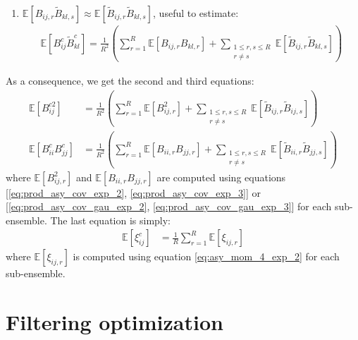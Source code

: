 \documentclass[12pt]{scrartcl}
\begin{document}
\begin{enumerate}
\begin{enumerate}
\item $\mathbb{E} \left[B_{ij,r} \widetilde{B}_{kl,s}\right] \approx \mathbb{E} \left[\widetilde{B}_{ij,r} \widetilde{B}_{kl,s}\right]$, useful to estimate:
\begin{align}
\mathbb{E} \left[B^c_{ij} \widetilde{B}^c_{kl} \right] = \frac{1}{R^2} \left(\sum_{r=1}^R \mathbb{E} \left[B_{ij,r} B_{kl,r}\right] + \sum_{\substack{1 \le r,s \le R\\r \ne s}} \mathbb{E} \left[\widetilde{B}_{ij,r} \widetilde{B}_{kl,s}\right]\right)
\end{align}
\end{enumerate}
As a consequence, we get the second and third equations:
\begin{subequations}
\begin{align}
\mathbb{E} \left[B^{c2}_{ij} \right] & = \frac{1}{R^2} \left(\sum_{r=1}^R \mathbb{E} \left[B^2_{ij,r}\right] + \sum_{\substack{1 \le r,s \le R\\r \ne s}} \mathbb{E} \left[\widetilde{B}_{ij,r} \widetilde{B}_{ij,s}\right]\right) \\
\mathbb{E} \left[B^c_{ii} B^c_{jj} \right] & = \frac{1}{R^2} \left(\sum_{r=1}^R \mathbb{E} \left[B_{ii,r} B_{jj,r}\right] + \sum_{\substack{1 \le r,s \le R\\r \ne s}} \mathbb{E} \left[\widetilde{B}_{ii,r} \widetilde{B}_{jj,s}\right]\right)
\end{align}
\end{subequations}
where $\mathbb{E} \left[B^2_{ij,r}\right]$ and $\mathbb{E} \left[B_{ii,r} B_{jj,r}\right]$ are computed using equations [\eqref{eq:prod_asy_cov_exp_2}, \eqref{eq:prod_asy_cov_exp_3}] or [\eqref{eq:prod_asy_cov_gau_exp_2}, \eqref{eq:prod_asy_cov_gau_exp_3}] for each sub-ensemble. The last equation is simply:
\begin{align}
\mathbb{E} \left[\xi^c_{ij}\right] & = \frac{1}{R} \sum_{r=1}^R \mathbb{E} \left[\xi_{ij,r}\right]
\end{align}
where $\mathbb{E} \left[\xi_{ij,r}\right]$ is computed using equation \eqref{eq:asy_mom_4_exp_2} for each sub-ensemble.
\end{enumerate}

\clearpage

\section{Filtering optimization}
\end{document}
